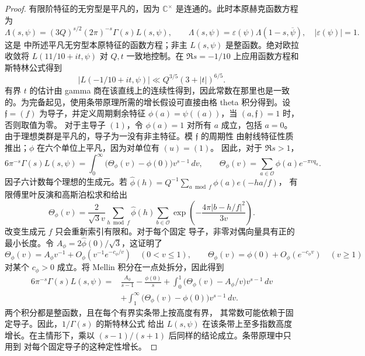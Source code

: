 \documentclass[11pt,a4paper]{article}
\numberwithin{equation}{section}
\numberwithin{figure}{section}
\theoremstyle{definition}
\theoremstyle{remark}
\begin{document}
\begin{proof}
有限阶特征的无穷型是平凡的，因为 $\mathbb C^\times$ 是连通的。此时本原赫克函数方程为
\[
 \Lambda(s,\psi)=(3Q)^{s/2}(2\pi)^{-s}\Gamma(s)L(s,\psi),\qquad
 \Lambda(s,\psi)=\varepsilon(\psi)\Lambda(1-s,\overline\psi),
 \quad |\varepsilon(\psi)|=1.
\]
这是 \cite[Equation (1.1)]{GZ} 中所述平凡无穷型本原特征的函数方程；非主 $L(s,\psi)$ 是整函数。绝对欧拉收敛将 $L(11/10+it,\psi)$ 对 $Q,t$ 一致地控制。在
$\Re s=-1/10$ 上应用函数方程和斯特林公式得到
\[
 |L(-1/10+it,\psi)|\ll Q^{3/5}(3+|t|)^{6/5}.
\]
有界 $t$ 的估计由 gamma 商在该直线上的连续性得到，因此常数在那里也是一致的。为完备起见，使用条带原理所需的增长假设可直接由格 theta 积分得到。设
$\mathfrak f=(f)$ 为导子，并定义周期剩余特征
$\phi(a)=\psi((a))$，当 $(a,\mathfrak f)=1$ 时，否则取值为零。
对于主导子 $(1)$，令 $\phi(a)=1$ 对所有 $a$ 成立，包括
$a=0$。由于理想类群是平凡的，导子为一没有非主特征。模 $\mathfrak f$ 的周期性
由射线特征性质推出；$\phi$ 在六个单位上平凡，因为对单位有 $(u)=(1)$。
因此，对于 $\Re s>1$，
\[
 6\pi^{-s}\Gamma(s)L(s,\psi)
 =\int_0^\infty\bigl(\Theta_\phi(v)-\phi(0)\bigr)v^{s-1}\,dv,
 \qquad
 \Theta_\phi(v)=\sum_{a\in\mathcal O}\phi(a)e^{-\pi vq_a}.
\]
因子六计数每个理想的生成元。若
$\widehat\phi(h)=Q^{-1}\sum_{a\bmod f}\phi(a)e(-ha/f)$，
有限傅里叶反演和高斯泊松求和给出
\[
 \Theta_\phi(v)=\frac{2}{\sqrt3v}
 \sum_{h\bmod f}\widehat\phi(h)
 \sum_{b\in\mathcal O}
    \exp\left(-\frac{4\pi|b-h/f|^2}{3v}\right).
\]
改变生成元 $f$ 只会重新索引有限和。对于每个固定
导子，非零对偶向量具有正的最小长度。令
$A_\phi=2\widehat\phi(0)/\sqrt3$，这证明了
\[
 \Theta_\phi(v)=A_\phi v^{-1}+O_\phi(v^{-1}e^{-c_\phi/v})\quad(0<v\le1),
 \qquad
 \Theta_\phi(v)=\phi(0)+O_\phi(e^{-c_\phi v})\quad(v\ge1)
\]
对某个 $c_\phi>0$ 成立。将 Mellin 积分在一点处拆分，因此得到
\[
 \begin{split}
 6\pi^{-s}\Gamma(s)L(s,\psi)
 ={}&\frac{A_\phi}{s-1}-\frac{\phi(0)}s
 +\int_0^1\bigl(\Theta_\phi(v)-A_\phi/v\bigr)v^{s-1}\,dv\\
 &+\int_1^\infty\bigl(\Theta_\phi(v)-\phi(0)\bigr)v^{s-1}\,dv.
 \end{split}
\]
两个积分都是整函数，且在每个有界实条带上按高度有界，
其常数可能依赖于固定导子。因此，$1/\Gamma(s)$ 的斯特林公式
给出 $L(s,\psi)$ 在该条带上至多指数高度增长。在主情形下，乘以
$(s-1)/(s+1)$ 后同样的结论成立。条带原理中只用到
对每个固定导子的这种定性增长。


\end{proof}
\end{document}
